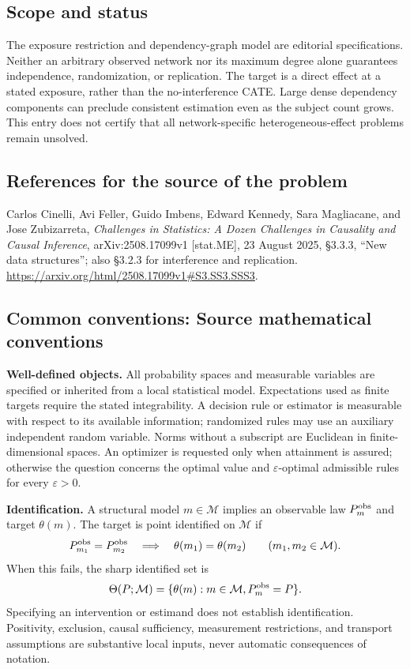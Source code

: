 \documentclass[11pt,a4paper]{article}
\begin{document}
\subsection*{Scope and status}
The exposure restriction and dependency-graph model are editorial specifications. Neither an arbitrary observed network nor its maximum degree alone guarantees independence, randomization, or replication. The target is a direct effect at a stated exposure, rather than the no-interference CATE. Large dense dependency components can preclude consistent estimation even as the subject count grows. This entry does not certify that all network-specific heterogeneous-effect problems remain unsolved.
\subsection*{References for the source of the problem}
Carlos Cinelli, Avi Feller, Guido Imbens, Edward Kennedy, Sara Magliacane, and Jose Zubizarreta, \emph{Challenges in Statistics: A Dozen Challenges in Causality and Causal Inference}, arXiv:2508.17099v1 [stat.ME], 23 August 2025, \S3.3.3, ``New data structures''; also \S3.2.3 for interference and replication. \url{https://arxiv.org/html/2508.17099v1#S3.SS3.SSS3}.

\subsection*{Common conventions: Source mathematical conventions}

\textbf{Well-defined objects.}
All probability spaces and measurable variables are specified or inherited
from a local statistical model. Expectations used as finite targets require
the stated integrability. A decision rule or estimator is measurable with
respect to its available information; randomized rules may use an auxiliary
independent random variable. Norms without a subscript are Euclidean in
finite-dimensional spaces. An optimizer is requested only when attainment
is assured; otherwise the question concerns the optimal value and
$\varepsilon$-optimal admissible rules for every $\varepsilon>0$.

\textbf{Identification.}
A structural model $m\in\mathcal M$ implies an observable law
$P_m^{\rm obs}$ and target $\theta(m)$. The target is point identified on
$\mathcal M$ if
\[
 P_{m_1}^{\rm obs}=P_{m_2}^{\rm obs}
 \quad\Longrightarrow\quad\theta(m_1)=\theta(m_2)
 \qquad(m_1,m_2\in\mathcal M).
\]
When this fails, the sharp identified set is
\[
 \Theta(P;\mathcal M)=\{\theta(m):m\in\mathcal M,
                                  P_m^{\rm obs}=P\}.
\]
Specifying an intervention or estimand does not establish identification.
Positivity, exclusion, causal sufficiency, measurement restrictions, and
transport assumptions are substantive local inputs, never automatic
consequences of notation.
\end{document}
